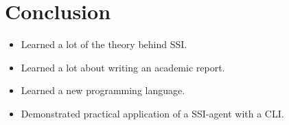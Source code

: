 \chapter{Conclusion}

\begin{itemize}
\item Learned a lot of the theory behind SSI.
\item Learned a lot about writing an academic report.
\item Learned a new programming language.
\item Demonstrated practical application of a SSI-agent with a CLI.
\end{itemize}